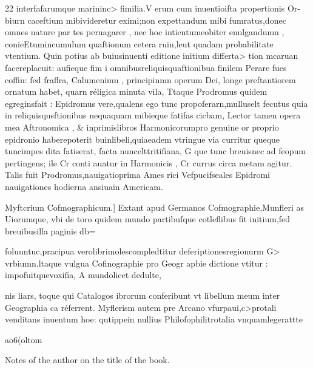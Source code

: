 \documentclass{article}
\begin{document}
{{{{22 interfafarumque marininc> fimilia.V erum cum inuentioifta propertionis Or-
biurn caceftium mibivideretur eximi;non expettandum mibi fumratus,donec omnes nature par
tes peruagarer , nec hoc intientumeobiter enulgandumn , conieEtumincumulum quaftionum cetera
ruin,leut quadam probabilitate vtentium. Quin potius ab buiusinuenti editione initium differta>
tion mcaruan facereplacuit: aufieque fim i omnibusreliquisquaftionibua finilem Perare fues
coffin: fed fraflra, Calumenimn , principinmn operum Dei, longe preftantiorem ornatum habet,
quarn réligica minuta vila, Ttaque Prodromus quidem egreginsfait : Epidromus vere,qualens
ego tunc propoferarn,mulluselt fecutus quia in reliquisqusftionibus nequaquam mibieque fatifas
cicbam, Lector tamen opera mea Aftronomica , & inprimislibros Harmonicorumpro genuine or
proprio epidronio haberepoterit buinlibeli,quiaeadem vtringue via curritur queque tuncimpes
dita fatiserat, facta nuncelttritifiana, G que tunc breuisnec ad feopum pertingens; ile Cr conti
auatur in Harmonicis , Cr currus circa metam agitur. Talis fuit Prodromus,nauigatioprima Ames
rici Vefpucifseales Epidromi nauigationes hodierna ansiuain Americam.

Myftcrium Cofmographicum.] Extant apud Germanos Cofmographie,Munfleri as
Uiorumque, vbi de toro quidem mundo partibufque cotleflibus fit initium,fed breuibusilla paginis db=
{foluuntuc,pracipua verolibrimolescompledtitur deferiptionesregionurm G> vrbiumn.ltaque vulgua
Cofinographie pro Geogr apbie dictione vtitur : impofuitquevoxifia, A mundolicet dedulte,

nis liars, toque qui Catalogos ibrorum conferibunt vt libellum meum inter Geographia
ca réferrent. Myflerism autem pre Arcano vfurpaui,c>protali venditans
inuentum hoe: qutippein nullius Philofophilitrotalia
vnquamlegerattte

ao6(oltom




Notes of the author on the title of the book.

}}}}}
\end{document}
